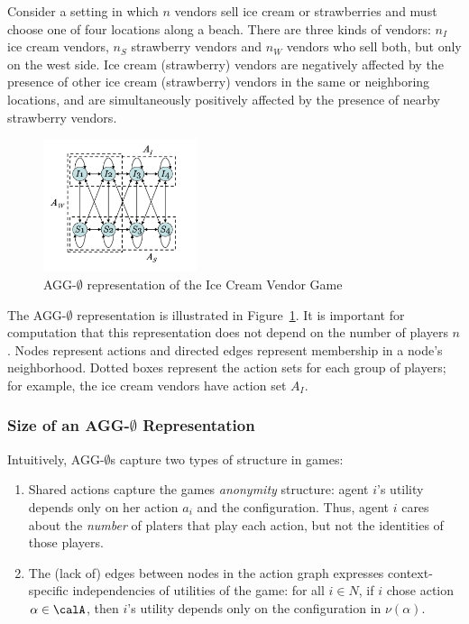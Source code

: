 \begin{example}
	Consider a setting in which $n$ vendors sell ice cream or strawberries and must choose one of four locations along a beach. There are three kinds of vendors: $n_I$ ice cream vendors, $n_S$ strawberry vendors and $n_W$ vendors who sell both, but only on the west side. Ice cream (strawberry) vendors are negatively affected by the presence of other ice cream (strawberry) vendors in the same or neighboring locations, and are simultaneously positively affected by the presence of nearby strawberry vendors. 
	\begin{figure}[htb!]
		\centering
		\includegraphics[width=0.4\textwidth]{figures/AGG-Fig1.png}
		\caption{AGG-\(\emptyset\) representation of the Ice Cream Vendor Game}
		\label{fig:AGG-Fig1}
	\end{figure}

	The AGG-\(\emptyset\) representation is illustrated in Figure~\ref{fig:AGG-Fig1}. It is important for computation that this representation does not depend on the number of players $n$. Nodes represent actions and directed edges represent membership in a node's neighborhood. Dotted boxes represent the action sets for each group of players; for example, the ice cream vendors have action set $A_I$.
\end{example}

\subsubsection{Size of an AGG-\texorpdfstring{\(\emptyset\)}{} Representation}

Intuitively, AGG-\(\emptyset\)s capture two types of structure in games:
\begin{enumerate}
	\item Shared actions capture the games \emph{anonymity} structure: agent $i$'s utility depends only on her action $a_i$ and the configuration. Thus, agent $i$ cares about the \emph{number} of platers that play each action, but not the identities of those players. 
	\item The (lack of) edges between nodes in the action graph expresses context-specific independencies of utilities of the game: for all $i \in N$, if $i$ chose action $\alpha \in \calA$, then $i$'s utility depends only on the configuration in $\nu(\alpha)$.
\end{enumerate}


